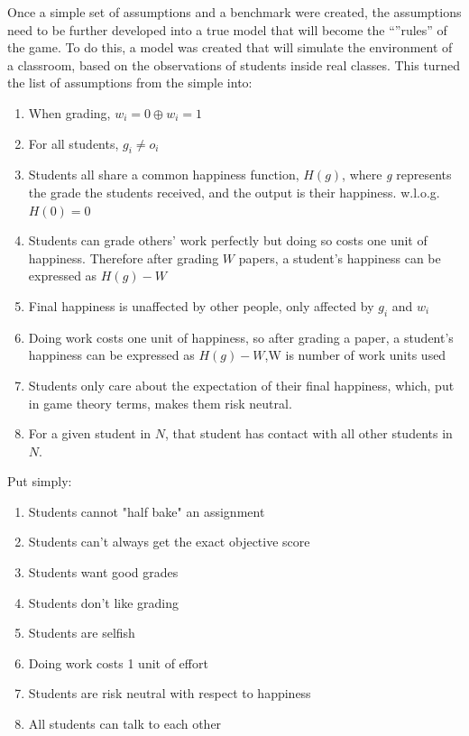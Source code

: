 \documentclass[12pt, Arial]{article}
\begin{document}

Once a simple set of assumptions and a benchmark were created, the assumptions need to be further developed into a true model that will become the ``''rules'' of the game. To do this, a model was created that will simulate the environment of a classroom, based on the observations of students inside real classes. This turned the list of assumptions from the 
simple into:
\begin{enumerate}
\item When grading, $w_i=0 \oplus w_i=1$
\item For all students, $g_i \neq o_i$
\item Students all share a common happiness function, $H(g)$, where \emph{g} represents the grade the students received, and the output is their happiness. w.l.o.g. $H(0)=0$
\item Students can grade others' work perfectly but doing so costs one unit of happiness. Therefore after grading $W$ papers, a student's happiness can be expressed as $H(g)-W$
\item Final happiness is unaffected by other people, only affected by $g_i$ and $w_i$
\item Doing work costs one unit of happiness, so after grading a paper, a student's happiness can be expressed as $H(g)-W$,W is number of work units used
\item Students only care about the expectation of their final happiness, which, put in game theory terms, makes them risk neutral.
\item For a given student in $N$, that student has contact with all other students in $N$.
\end{enumerate}
Put simply:
\begin{enumerate}
\item Students cannot "half bake" an assignment
\item Students can't always get the exact objective score
\item Students want good grades
\item Students don't like grading
\item Students are selfish
\item Doing work costs 1 unit of effort
\item Students are risk neutral with respect to happiness
\item All students can talk to each other
\end{enumerate}
\end{document}
